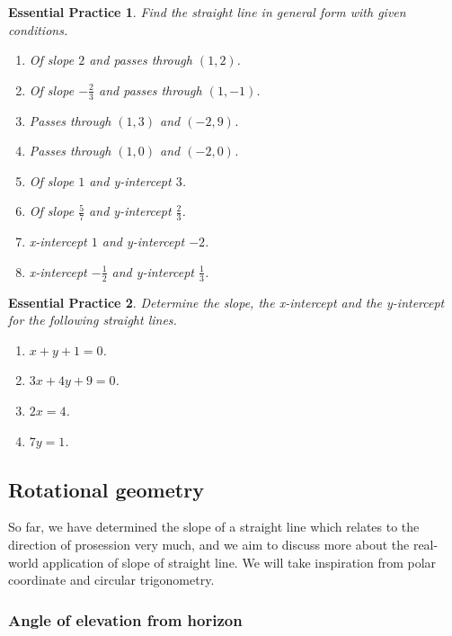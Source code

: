 \documentclass[12pt]{article}
\newtheorem{exercise}{Essential Practice}[subsection]
\begin{document}
    \begin{exercise}
        Find the straight line in general form with given conditions. \begin{enumerate}
            \item Of slope $2$ and passes through $(1,2)$.
            \item Of slope $-\frac{2}{3}$ and passes through $(1,-1)$.
            \item Passes through $(1,3)$ and $(-2,9)$.
            \item Passes through $(1,0)$ and $(-2,0)$.
            \item Of slope $1$ and y-intercept $3$.
            \item Of slope $\frac{5}{7}$ and y-intercept $\frac{2}{3}$.
            \item x-intercept $1$ and y-intercept $-2$.
            \item x-intercept $-\frac{1}{2}$ and y-intercept $\frac{1}{3}$.
        \end{enumerate}
    \end{exercise}

    \begin{exercise}
        Determine the slope, the x-intercept and the y-intercept for the following straight lines.\begin{enumerate}
            \item $x+y+1=0$.
            \item $3x+4y+9=0$.
            \item $2x=4$.
            \item $7y=1$.
        \end{enumerate}
    \end{exercise}

    \subsection{Rotational geometry}

    So far, we have determined the slope of a straight line which relates to the direction of prosession very much, and we aim to discuss more about the real-world application of slope of straight line. We will take inspiration from polar coordinate and circular trigonometry.

    \subsubsection*{Angle of elevation from horizon}
\end{document}
